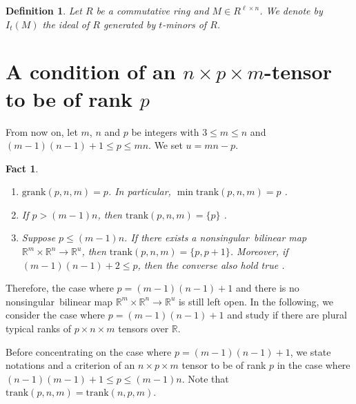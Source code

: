 \documentclass[a4paper,12pt]{article}
\newcommand{\RRR}{\mathbb{R}}
\newcommand\nonsing{nonsingular}
\newcommand{\grank}{{\mathrm{grank}}}
\newcommand{\trank}{{\mathrm{trank}}}
\newtheorem{fact}[thm]{Fact}
\newtheorem{definition}[thm]{Definition}
\begin{document}
\begin{definition}
Let $R$ be a commutative ring and $M\in R^{\ell\times n}$.
We denote by $I_t(M)$ the ideal of $R$ generated by $t$-minors of $R$.
\end{definition}





\section{A condition of an $n\times p\times m$-tensor to be of rank $p$}


From now on, let $m$, $n$ and $p$ be integers with $3\leq m\leq n$ and
$(m-1)(n-1)+1\leq p\leq mn$.
We set $u=mn-p$.

\begin{fact}
\begin{enumerate}
\item
$\grank(p,n,m)=p$.
In particular, $\min\trank(p,n,m)=p$ \cite{cgg02}.
\item
If $p>(m-1)n$, then $\trank(p,n,m)=\{p\}$ \cite{tb00}.
\item
Suppose $p\leq (m-1)n$.
If there exists a \nonsing\  bilinear map
$\RRR^m\times\RRR^n\to\RRR^u$, then $\trank(p,n,m)=\{p,p+1\}$.
Moreover, if $(m-1)(n-1)+2\leq p$, then the converse also hold true
\cite{ssm13,sms15, sms17}.
\end{enumerate}
\end{fact}


Therefore, the case where $p=(m-1)(n-1)+1$ and there is no \nonsing\ 
bilinear map $\RRR^m\times\RRR^n\to\RRR^u$ is still left open.
In the following, we consider the case where $p=(m-1)(n-1)+1$ and study 
if there are plural typical ranks of $p\times n\times m$ tensors over $\RRR$.

Before concentrating on the case where $p=(m-1)(n-1)+1$, we state
notations and a criterion of an $n\times p\times m$ tensor to be of rank $p$
in the case where $(n-1)(m-1)+1\leq p\leq (m-1)n$.
Note that $\trank(p,n,m)=\trank(n,p,m)$.
\end{document}
